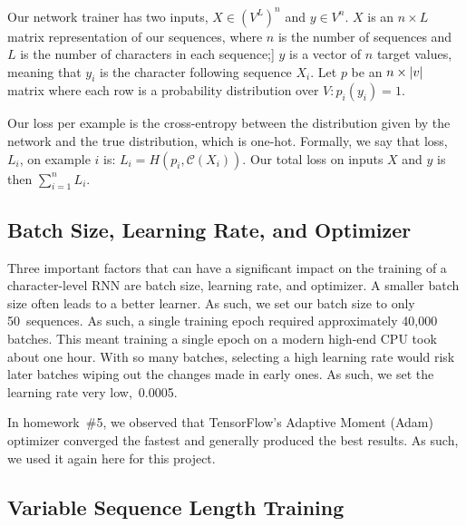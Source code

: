 \documentclass{article}
\DeclarePairedDelimiter\abs{\lvert}{\rvert}%
\begin{document}

Our network trainer has two inputs, ${X \in \left(V^L\right)^n}$ and $y \in V^n$. $X$ is an $n \times L$ matrix representation of our sequences, where $n$ is the number of sequences and $L$ is the number of characters in each sequence;] $y$ is a vector of $n$ target values, meaning that $y_i$ is the character following sequence $X_i$. Let $p$ be an $n \times \abs*{v}$ matrix where each row is a probability distribution over $V : p_i(y_i) = 1$.

Our loss per example is the cross-entropy between the distribution given by the network and the true distribution, which is one-hot. Formally, we say that loss,~$L_i$, on example $i$ is: $L_i = H(p_i, \mathcal{C}(X_i))$. Our total loss on inputs $X$ and $y$ is then $\sum_{i=1}^{n} L_i$.

\subsection{Batch Size, Learning Rate, and Optimizer}

Three important factors that can have a significant impact on the training of a character-level RNN are batch size, learning rate, and optimizer.  A smaller batch size often leads to a better learner.  As such, we set our batch size to only 50~sequences.  As such, a single training epoch required approximately 40,000 batches. This meant training a single epoch on a modern high-end CPU took about one hour.  With so many batches, selecting a high learning rate would risk later batches wiping out the changes made in early ones.  As such, we set the learning rate very low,~0.0005. 

In homework~\#5, we observed that TensorFlow's Adaptive Moment (Adam) optimizer converged the fastest and generally produced the best results.  As such, we used it again here for this project.  

\subsection{Variable Sequence Length Training}
\end{document}
